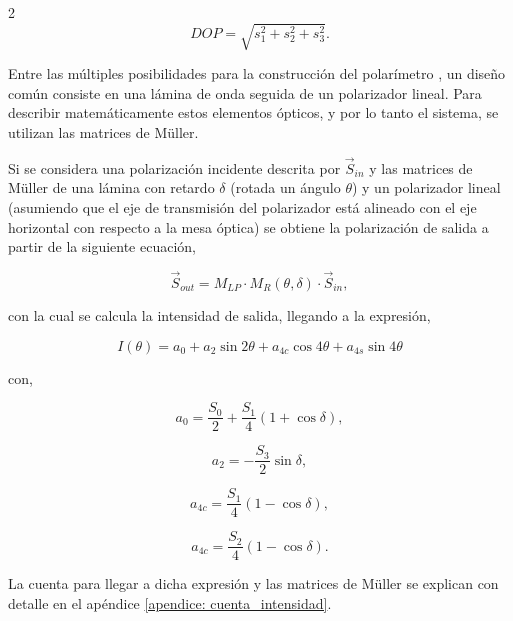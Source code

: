 \documentclass[11pt,a4paper]{article}
\begin{document}
\begin{multicols}{2}
\begin{equation*}
    DOP = \sqrt{s_1^2 + s_2^2 + s_3^2}.
\end{equation*}

Entre las múltiples posibilidades para la construcción del polarímetro \cite{polarimetros}, un diseño común consiste en una lámina de onda seguida de un polarizador lineal. Para describir matemáticamente estos elementos ópticos, y por lo tanto el sistema, se utilizan las matrices de Müller.


Si se considera una polarización incidente descrita por $\vec{S}_{in}$ y las matrices de Müller de una lámina con retardo $\delta$ (rotada un ángulo $\theta$) y un polarizador lineal (asumiendo que el eje de transmisión del polarizador está alineado con el eje horizontal con respecto a la mesa óptica) se obtiene la polarización de salida a partir de la siguiente ecuación,


\begin{equation*}
    \vec{S}_{out} = M_{LP} \cdot M_{R}(\theta,\delta) \cdot \vec{S}_{in},
\end{equation*}

\noindent con la cual se calcula la intensidad de salida, llegando a la expresión,

\begin{equation}\label{ecuacion: ecuacion_intensidad}
    I(\theta) = a_0 + a_2 \sin 2\theta + a_{4c} \cos 4\theta + a_{4s}\sin 4\theta 
\end{equation}

\noindent con,

\begin{equation*}
    a_0 = \frac{S_0}{2} + \frac{S_1}{4}(1+\cos \delta),
\end{equation*}

\begin{equation*}
    a_2 = - \frac{S_3}{2}\sin \delta,
\end{equation*}

\begin{equation*}
    a_{4c} = \frac{S_1}{4}(1-\cos \delta),
\end{equation*}

\begin{equation*}
    a_{4c} = \frac{S_2}{4}(1-\cos \delta).
\end{equation*}

La cuenta para llegar a dicha expresión y las matrices de Müller se explican con detalle en el apéndice \ref{apendice: cuenta_intensidad}.


\end{multicols}
\end{document}
